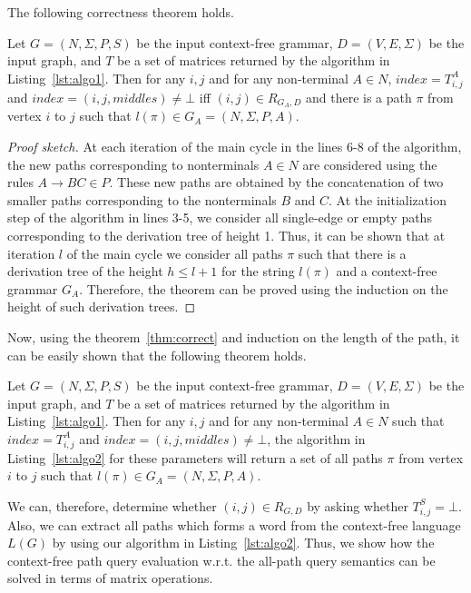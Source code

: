 The following correctness theorem holds.

\begin{mytheorem}\label{thm:correct}
Let $G = (N, \Sigma, P, S)$ be the input context-free grammar, $D = (V, E, \Sigma)$ be the input graph, and $T$ be a set of matrices returned by the algorithm in Listing~\ref{lst:algo1}. Then for any $i, j$ and for any non-terminal $A \in N$, $index = T^A_{i,j}$ and $index = (i,j,middles) \neq \bot$ iff $(i,j) \in R_{G_A, D}$ and there is a path $\pi$ from vertex $i$ to $j$ such that $l(\pi) \in G_A = (N,\Sigma,P,A)$.
\end{mytheorem}
\begin{proof}[Proof sketch]
	At each iteration of the main cycle in the lines 6-8 of the algorithm, the new paths corresponding to nonterminals $A \in N$ are considered using the rules $A \to B C \in P$. These new paths are obtained by the concatenation of two smaller paths corresponding to the nonterminals $B$ and $C$. At the initialization step of the algorithm in lines 3-5, we consider all single-edge or empty paths corresponding to the derivation tree of height 1. Thus, it can be shown that at iteration $l$ of the main cycle we consider all paths $\pi$ such that there is a derivation tree of the height $h \leq l + 1$ for the string $l(\pi)$ and a context-free grammar $G_A$. Therefore, the theorem can be proved using the induction on the height of such derivation trees.
	
\end{proof}

Now, using the theorem~\ref{thm:correct} and induction on the length of the path, it can be easily shown that the following theorem holds.

\begin{mytheorem}\label{thm:correct_extraction}
Let $G = (N, \Sigma, P, S)$ be the input context-free grammar, $D = (V, E, \Sigma)$ be the input graph, and $T$ be a set of matrices returned by the algorithm in Listing~\ref{lst:algo1}. Then for any $i, j$ and for any non-terminal $A \in N$ such that $index = T^A_{i,j}$ and $index = (i,j,middles) \neq \bot$, the algorithm in Listing~\ref{lst:algo2} for these parameters will return a set of all paths $\pi$ from vertex $i$ to $j$ such that $l(\pi) \in G_A = (N,\Sigma,P,A)$.
\end{mytheorem}

We can, therefore, determine whether $(i,j) \in R_{G, D}$ by asking whether $T^S_{i,j} = \bot$. Also, we can extract all paths which forms a word from the context-free language $L(G)$ by using our algorithm in Listing~\ref{lst:algo2}. Thus, we show how the context-free path query evaluation w.r.t. the all-path query semantics can be solved in terms of matrix operations.

